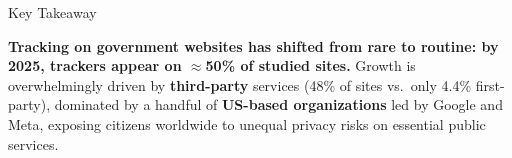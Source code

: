   \begin{alertblock}{Key Takeaway}

    \textbf{Tracking on government websites has shifted from rare to routine: by 2025, trackers appear on $\approx$50\% of studied sites.} Growth is overwhelmingly driven by \textbf{third-party} services (48\% of sites vs.\ only 4.4\% first-party), dominated by a handful of \textbf{US-based organizations} led by Google and Meta, exposing citizens worldwide to unequal privacy risks on essential public services.

  \end{alertblock}
